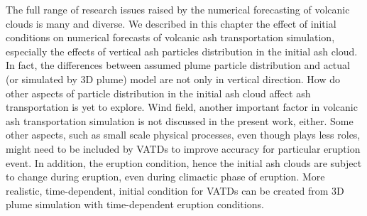The full range of research issues raised by the numerical forecasting of volcanic clouds is many and diverse. We described in this chapter the effect of initial conditions on numerical forecasts of volcanic ash transportation simulation, especially the effects of vertical ash particles distribution in the initial ash cloud. 
In fact, the differences between assumed plume particle distribution and actual (or simulated by 3D plume) model are not only in vertical direction. How do other aspects of particle distribution in the initial ash cloud affect ash transportation is yet to explore. Wind field, another important factor in volcanic ash transportation simulation is not discussed in the present work, either. Some other aspects, such as small scale physical processes, even though plays less roles, might need to be included by VATDs to improve accuracy for particular eruption event. In addition, the eruption condition, hence the initial ash clouds are subject to change during eruption, even during climactic phase of eruption. More realistic, time-dependent, initial condition for VATDs can be created from 3D plume simulation with time-dependent eruption conditions.